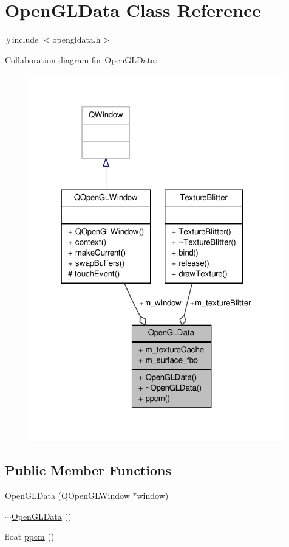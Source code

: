 \hypertarget{classOpenGLData}{\section{Open\-G\-L\-Data Class Reference}
\label{classOpenGLData}
}


{\ttfamily \#include $<$opengldata.\-h$>$}



Collaboration diagram for Open\-G\-L\-Data\-:
\nopagebreak
\begin{figure}[H]
\begin{center}
\leavevmode
\includegraphics[width=315pt]{classOpenGLData__coll__graph}
\end{center}
\end{figure}
\subsection*{Public Member Functions}
\begin{DoxyCompactItemize}
\item 
\hyperlink{classOpenGLData_ae45b74d0a593e043189b8118e6abcb23}{Open\-G\-L\-Data} (\hyperlink{classQOpenGLWindow}{Q\-Open\-G\-L\-Window} $\ast$window)
\item 
\hyperlink{classOpenGLData_a9241741339383a555a7189f472006a22}{$\sim$\-Open\-G\-L\-Data} ()
\item 
float \hyperlink{classOpenGLData_a8345c6c7bb79a3e48dfea00b786525c7}{ppcm} ()
\end{DoxyCompactItemize}
